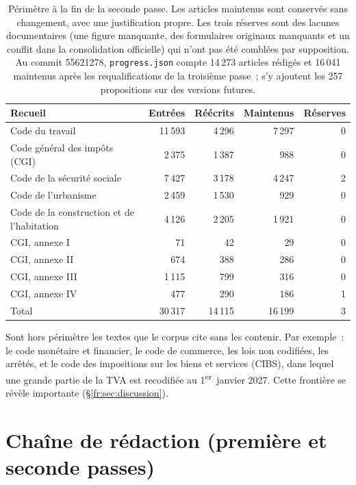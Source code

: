 \documentclass[11pt,a4paper]{article}
\begin{document}
\begin{table}[ht]
\centering
\small
\begin{tabularx}{\linewidth}{lRRRR}
\toprule
Recueil & Entrées & Réécrits & Maintenus & Réserves\\
\midrule
Code du travail & 11\,593 & 4\,296 & 7\,297 & 0\\
Code général des impôts (CGI) & 2\,375 & 1\,387 & 988 & 0\\
Code de la sécurité sociale & 7\,427 & 3\,178 & 4\,247 & 2\\
Code de l'urbanisme & 2\,459 & 1\,530 & 929 & 0\\
Code de la construction et de l'habitation & 4\,126 & 2\,205 & 1\,921 & 0\\
CGI, annexe I & 71 & 42 & 29 & 0\\
CGI, annexe II & 674 & 388 & 286 & 0\\
CGI, annexe III & 1\,115 & 799 & 316 & 0\\
CGI, annexe IV & 477 & 290 & 186 & 1\\
\midrule
Total & 30\,317 & 14\,115 & 16\,199 & 3\\
\bottomrule
\end{tabularx}
\caption{Périmètre à la fin de la seconde passe. Les articles \og maintenus \fg{} sont conservés sans changement, avec une justification propre. Les trois \og réserves \fg{} sont des lacunes documentaires (une figure manquante, des formulaires originaux manquants et un conflit dans la consolidation officielle) qui n'ont pas été comblées par supposition. Au commit 55621278, \texttt{progress.json} compte 14\,273 articles rédigés et 16\,041 maintenus après les requalifications de la troisième passe~; s'y ajoutent les 257 propositions sur des versions futures.}
\label{fr:tab:corpus}
\end{table}

Sont hors périmètre les textes que le corpus cite sans les contenir. Par exemple~: le code monétaire et financier, le code de commerce, les lois non codifiées, les arrêtés, et le code des impositions sur les biens et services (CIBS), dans lequel une grande partie de la TVA est recodifiée au 1\textsuperscript{er}~janvier 2027. Cette frontière se révèle importante (\S\ref{fr:sec:discussion}).

\section{Chaîne de rédaction (première et seconde passes)}
\label{fr:sec:drafting}
\end{document}
